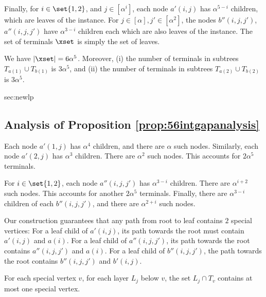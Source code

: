 Finally, for $i \in \set{1,2}$, and $j \in [\alpha^i]$, each node $a'(i,j)$ has $\alpha^{5-i}$ children, which are leaves of the instance.  
For $j \in [\alpha], j' \in [\alpha^2]$, the nodes $b''(i,j,j')$, $a''(i,j,j')$ have $\alpha^{3-i}$ children each which are also leaves of the instance. 
The set of terminals $\xset$ is simply the set of leaves. 

\begin{proposition} 
We have $|\xset|  = 6 \alpha^5$.
Moreover, 
(i) the number of terminals in subtrees $T_{a(1)} \cup T_{b(1)}$ is $3 \alpha^5$, and (ii) the number of terminals in subtrees $T_{a(2)} \cup T_{b(2)}$ is $3 \alpha^5$.  
\label{prop:56intgapanalysis}
\end{proposition}  

\begin{appendixproof}{sec:newlp}{\subsection{Analysis of Proposition \ref{prop:56intgapanalysis}}}
Each node $a'(1,j)$ has $\alpha^4$ children, and there are $\alpha$ such nodes. 
Similarly, each node $a'(2,j)$ has $\alpha^3$ children. There are $\alpha^2$ such nodes. 
This accounts for $2 \alpha^5$ terminals. 

For $i \in \set{1,2}$, each node $a''(i,j,j')$ has $\alpha^{3-i}$ children. 
There are $\alpha^{i+2}$ such nodes. 
This accounts for another $2 \alpha^5$ terminals. 
Finally, there are $\alpha^{3-i}$ children of each $b''(i,j,j')$, and there are $\alpha^{2+i}$ such nodes. 



\end{appendixproof} 


\vspace{0.1in} 

Our construction guarantees that any path from root to leaf contains $2$ special vertices: For a leaf child of $a'(i,j)$, its path towards the root must contain $a'(i,j)$ and $a(i)$. 
For a leaf child of $a''(i,j,j')$, its path towards the root contains $a''(i,j,j')$ and $a(i)$. 
For a leaf child of $b''(i,j,j')$, the path towards the root contains $b''(i,j,j')$ and $b'(i,j)$.   

  


\begin{lemma}
\label{lem:feas}  
For each special vertex $v$, for each layer $L_j$ below $v$, the set $L_j \cap T_v$ contains at most one special vertex. 
\end{lemma} 

